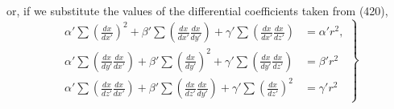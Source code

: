 \documentclass[12pt]{memoir}
\begin{document}
{or, if we substitute the values of the differential coefficients taken from (420),
\begin{equation} \left. \begin{aligned}
\alpha' \sum \left( \frac{dx}{dx'} \right)^2 +              \beta' \sum \left( \frac{dx}{dx'}\frac{dx}{dy'} \right)   + \gamma' \sum \left( \frac{dx}{dx'}\frac{dx}{dz'} \right) &= \alpha' r^2, \\
\alpha' \sum \left(  \frac{dx}{dy'}\frac{dx}{dx'} \right) + \beta' \sum \left( \frac{dx}{dy'} \right)^2   +             \gamma' \sum \left( \frac{dx}{dy'}\frac{dx}{dz'} \right) &=  \beta'r^2 \\
\alpha' \sum \left(  \frac{dx}{dz'}\frac{dx}{dx'} \right) + \beta' \sum \left( \frac{dx}{dz'} \frac{dx}{dy'} \right)  + \gamma' \sum \left( \frac{dx}{dz'} \right)^2 &= \gamma' r^2
\end{aligned}
\right\}
\label{429}
\end{equation}

}
\end{document}
